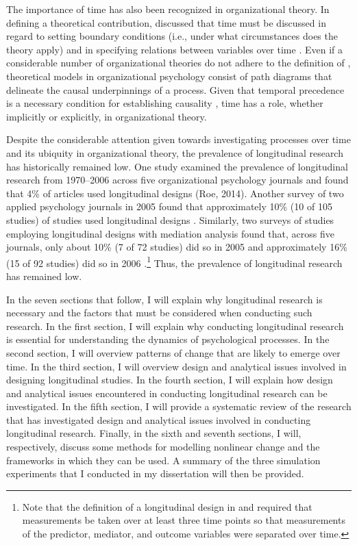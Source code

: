 \documentclass[
12pt, %
twoside,
english]{guelphthesis}
\begin{document}
The importance of time has also been recognized in organizational theory. In defining a theoretical contribution, \textcite{whetten1989} discussed that time must be discussed in regard to setting boundary conditions (i.e., under what circumstances does the theory apply) and in specifying relations between variables over time \autocite{mitchell2001,george2000}. Even if a considerable number of organizational theories do not adhere to the definition of \textcite{whetten1989}, theoretical models in organizational psychology consist of path diagrams that delineate the causal underpinnings of a process. Given that temporal precedence is a necessary condition for establishing causality \autocite{mill2011}, time has a role, whether implicitly or explicitly, in organizational theory.

Despite the considerable attention given towards investigating processes over time and its ubiquity in organizational theory, the prevalence of longitudinal research has historically remained low. One study examined the prevalence of longitudinal research from 1970--2006 across five organizational psychology journals and found that 4\% of articles used longitudinal designs (Roe, 2014). Another survey of two applied psychology journals in 2005 found that approximately 10\% (10 of 105 studies) of studies used longitudinal designs \autocite{roe2008}. Similarly, two surveys of studies employing longitudinal designs with mediation analysis found that, across five journals, only about 10\% (7 of 72 studies) did so in 2005 \autocite{maxwell2007} and approximately 16\% (15 of 92 studies) did so in 2006 \autocite{mitchell2013}.\footnote{Note that the definition of a longitudinal design in \textcite{maxwell2007} and \textcite{mitchell2013} required that measurements be taken over at least three time points so that measurements of the predictor, mediator, and outcome variables were separated over time.} Thus, the prevalence of longitudinal research has remained low.

In the seven sections that follow, I will explain why longitudinal research is necessary and the factors that must be considered when conducting such research. In the first section, I will explain why conducting longitudinal research is essential for understanding the dynamics of psychological processes. In the second section, I will overview patterns of change that are likely to emerge over time. In the third section, I will overview design and analytical issues involved in designing longitudinal studies. In the fourth section, I will explain how design and analytical issues encountered in conducting longitudinal research can be investigated. In the fifth section, I will provide a systematic review of the research that has investigated design and analytical issues involved in conducting longitudinal research. Finally, in the sixth and seventh sections, I will, respectively, discuss some methods for modelling nonlinear change and the frameworks in which they can be used. A summary of the three simulation experiments that I conducted in my dissertation will then be provided.
\end{document}

